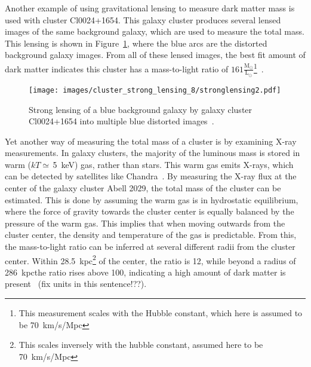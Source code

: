 Another example of using gravitational lensing to measure dark matter mass is used with cluster Cl0024+1654.
This galaxy cluster produces several lensed images of the same background galaxy, which are used to measure the total mass.
This lensing is shown in Figure~\ref{fig:stronglens}, where the blue arcs are the distorted background galaxy images.
From all of these lensed images, the best fit amount of dark matter indicates this cluster has a mass-to-light ratio of $161 \frac{\textrm{M}_{\odot}}{\textrm{L}_{\odot}}$\footnote[3]{This measurement scales with the Hubble constant, which here is assumed to be \SI{70}{km/s/Mpc}}~\cite{cluster_strong_lensing_1996, cluster_strong_lensing_1998, cluster_strong_lensing_2010}.
    
\begin{figure}[!ht]
  \centering
  \texttt{[image: images/cluster\_strong\_lensing\_8/stronglensing2.pdf]}
  \caption[Gravitational Lensing in Cl0024+1654]{
    Strong lensing of a blue background galaxy by galaxy cluster Cl0024+1654 into multiple blue distorted images~\cite{cluster_strong_lensing_1996}.
  }
  \label{fig:stronglens}
\end{figure}
    
Yet another way of measuring the total mass of a cluster is by examining X-ray measurements.
In galaxy clusters, the majority of the luminous mass is stored in warm ($kT\simeq\,$\SI{5}{keV}) gas, rather than stars.
This warm gas emits X-rays, which can be detected by satellites like Chandra~\cite{chandra}.
By measuring the X-ray flux at the center of the galaxy cluster Abell 2029, the total mass of the cluster can be estimated.
This is done by assuming the warm gas is in hydrostatic equilibrium, where the force of gravity towards the cluster center is equally balanced by the pressure of the warm gas.
This implies that when moving outwards from the cluster center, the density and temperature of the gas is predictable.
From this, the mass-to-light ratio can be inferred at several different radii from the cluster center.
Within \SI{28.5}{kpc}\footnote[2]{This scales inversely with the hubble constant, assumed here to be \SI{70}{km/s/Mpc}} of the center, the ratio is \SI{12}{}, while beyond a radius of \SI{286}{kpc}\footnotemark[2] the ratio rises above \SI{100}{}, indicating a high amount of dark matter is present~\cite{cluster_chandra} {\color{red}(fix units in this sentence!??)}.

